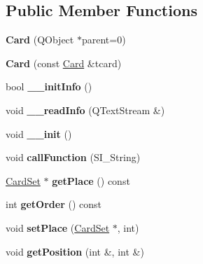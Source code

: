\subsection*{Public Member Functions}
\begin{DoxyCompactItemize}
\item 
\mbox{\label{class_card_a6028479328172961db1bf1a508ed09b0}} 
{\bfseries Card} (Q\+Object $\ast$parent=0)
\item 
\mbox{\label{class_card_a3797acfaee3be9d91b3c0ebc09490b56}} 
{\bfseries Card} (const \hyperlink{class_card}{Card} \&tcard)
\item 
\mbox{\label{class_card_a27001cb04a123c389457e599387e9ea8}} 
bool {\bfseries \+\_\+\+\_\+init\+Info} ()
\item 
\mbox{\label{class_card_a1ab2585666a2197ca28a5f4de71aecb8}} 
void {\bfseries \+\_\+\+\_\+read\+Info} (Q\+Text\+Stream \&)
\item 
\mbox{\label{class_card_a33d357ac1f0043989f87c0c24d3e24e9}} 
void {\bfseries \+\_\+\+\_\+init} ()
\item 
\mbox{\label{class_card_a77f2d72697f3d2cd7145d72c397894fc}} 
void {\bfseries call\+Function} (S\+I\+\_\+\+String)
\item 
\mbox{\label{class_card_a8594374030d81e2ff7810df6fc64b63e}} 
\hyperlink{class_card_set}{Card\+Set} $\ast$ {\bfseries get\+Place} () const
\item 
\mbox{\label{class_card_ae4752ed5bf120afc48e9fd65ea6dab52}} 
int {\bfseries get\+Order} () const
\item 
\mbox{\label{class_card_a660219c0fc2677abea4f8dfb2f8d3449}} 
void {\bfseries set\+Place} (\hyperlink{class_card_set}{Card\+Set} $\ast$, int)
\item 
\mbox{\label{class_card_a6c6b39f3b6c64d5775e172dcfaefdf89}} 
void {\bfseries get\+Position} (int \&, int \&)
\item 
\mbox{\label{class_card_a9ac3fd6811dfbb5fef7ab507c5ae52e5}} 

\end{DoxyCompactItemize}
